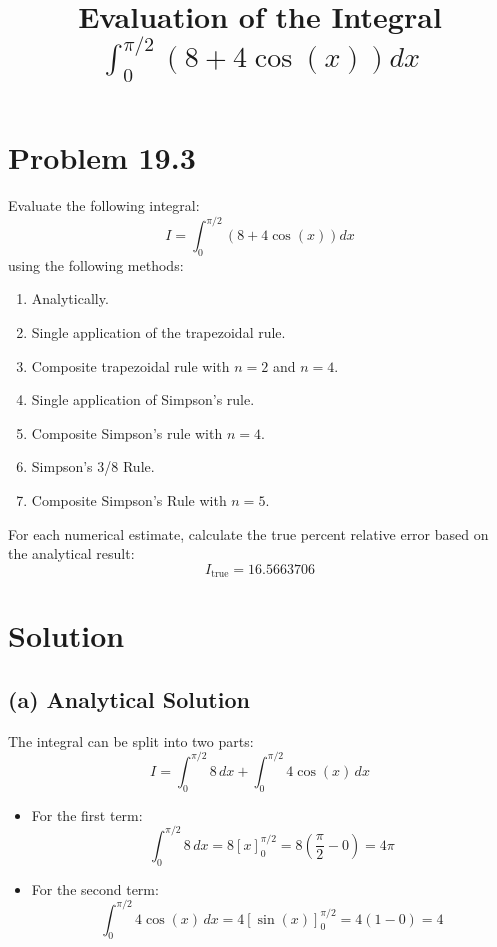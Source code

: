 \documentclass[11pt]{article}
\title{Evaluation of the Integral \(\int_{0}^{\pi/2} (8 + 4\cos(x))dx\)}
\author{}
\date{}
\begin{document}
\maketitle

\section*{Problem 19.3}
Evaluate the following integral:
\[
I = \int_{0}^{\pi/2} \left(8 + 4\cos(x)\right)dx
\]
using the following methods:
\begin{enumerate}
    \item Analytically.
    \item Single application of the trapezoidal rule.
    \item Composite trapezoidal rule with \(n = 2\) and \(n = 4\).
    \item Single application of Simpson's rule.
    \item Composite Simpson's rule with \(n = 4\).
    \item Simpson's 3/8 Rule.
    \item Composite Simpson's Rule with \(n = 5\).
\end{enumerate}

For each numerical estimate, calculate the true percent relative error based on the analytical result:
\[
I_{\text{true}} = 16.5663706
\]



\section*{Solution}

\subsection*{(a) Analytical Solution}
The integral can be split into two parts:
\[
I = \int_{0}^{\pi/2} 8\,dx + \int_{0}^{\pi/2} 4\cos(x)\,dx
\]

\begin{itemize}
    \item For the first term:
    \[
    \int_{0}^{\pi/2} 8\,dx = 8\left[x\right]_0^{\pi/2} = 8\left(\frac{\pi}{2} - 0\right) = 4\pi
    \]

    \item For the second term:
    \[
    \int_{0}^{\pi/2} 4\cos(x)\,dx = 4\left[\sin(x)\right]_0^{\pi/2} = 4(1 - 0) = 4
    \]
\end{itemize}
\end{document}
